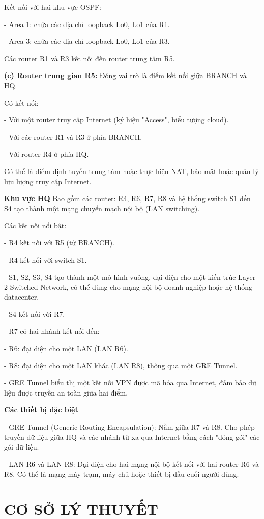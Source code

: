 \documentclass[13pt]{article}
\begin{document}
Kết nối với hai khu vực OSPF:

- Area 1: chứa các địa chỉ loopback Lo0, Lo1 của R1.

- Area 3: chứa các địa chỉ loopback Lo0, Lo1 của R3.

Các router R1 và R3 kết nối đến router trung tâm R5.


\textbf{(c) Router trung gian R5:}
Đóng vai trò là điểm kết nối giữa BRANCH và HQ.

Có kết nối:

- Với một router truy cập Internet (ký hiệu "Access", biểu tượng cloud).

- Với các router R1 và R3 ở phía BRANCH.

- Với router R4 ở phía HQ.

Có thể là điểm định tuyến trung tâm hoặc thực hiện NAT, bảo mật hoặc quản lý lưu lượng truy cập Internet.



\textbf{Khu vực HQ}
Bao gồm các router: R4, R6, R7, R8 và hệ thống switch S1 đến S4 tạo thành một mạng chuyển mạch nội bộ (LAN switching).

Các kết nối nổi bật:

- R4 kết nối với R5 (từ BRANCH).

- R4 kết nối với switch S1.

- S1, S2, S3, S4 tạo thành một mô hình vuông, đại diện cho một kiến trúc Layer 2 Switched Network, có thể dùng cho mạng nội bộ doanh nghiệp hoặc hệ thống datacenter.

- S4 kết nối với R7.

- R7 có hai nhánh kết nối đến:

- R6: đại diện cho một LAN (LAN R6).

- R8: đại diện cho một LAN khác (LAN R8), thông qua một GRE Tunnel.

- GRE Tunnel biểu thị một kết nối VPN được mã hóa qua Internet, đảm bảo dữ liệu được truyền an toàn giữa hai điểm.


\textbf{Các thiết bị đặc biệt}

- GRE Tunnel (Generic Routing Encapsulation): Nằm giữa R7 và R8. Cho phép truyền dữ liệu giữa HQ và các nhánh từ xa qua Internet bằng cách "đóng gói" các gói dữ liệu.

- LAN R6 và LAN R8: Đại diện cho hai mạng nội bộ kết nối với hai router R6 và R8. Có thể là mạng máy trạm, máy chủ hoặc thiết bị đầu cuối người dùng.



        \section{CƠ SỞ LÝ THUYẾT}
\end{document}
